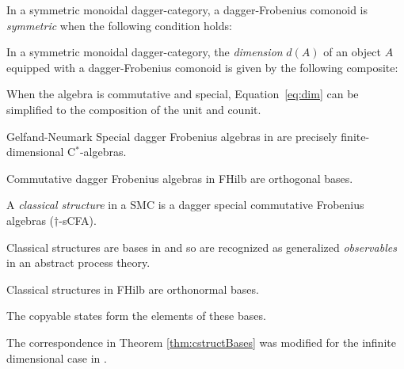 \begin{defn}
In a symmetric monoidal dagger-category, a dagger-Frobenius comonoid is \emph{symmetric} when the following condition holds:
\begin{equation}

\end{equation}
\end{defn}

\begin{defn}
In a symmetric monoidal dagger-category, the \emph{dimension} $d(A)$ of an object $A$ equipped with a dagger-Frobenius comonoid  is given by the following composite:
\begin{equation}
\label{eq:dim}

\end{equation}
\end{defn}
\noindent
When the algebra is commutative and special, Equation~\eqref{eq:dim} can be simplified to the composition of the unit and counit.

\begin{defn}
\end{defn}

\begin{theorem}{Gelfand-Neumark}
Special dagger Frobenius algebras in  are precisely finite-dimensional C$^*$-algebras.
\end{theorem}

\begin{theorem}{\cite[Thm 5.1]{coecke2013new}}
Commutative dagger Frobenius algebras in FHilb are orthogonal bases.
\end{theorem}

\begin{defn}
A \emph{classical structure} in a SMC is a dagger special commutative Frobenius algebras ($\dagger$-sCFA).
\end{defn}
\noindent Classical structures are bases in  and so are recognized as generalized \emph{observables} in an abstract process theory.

\begin{theorem}{\cite[Sec 6]{coecke2013new}}
\label{thm:cstructBases}
Classical structures in FHilb are orthonormal bases.
\end{theorem}

\noindent The copyable states form the elements of these bases.

\begin{remark}
The correspondence in Theorem \ref{thm:cstructBases} was modified for the infinite dimensional case in \cite{abramsky2012h}.
\end{remark}

